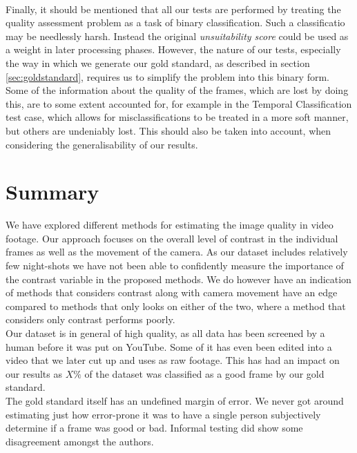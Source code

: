 \\
Finally, it should be mentioned that all our tests are performed by treating the quality assessment problem as a task of binary classification. Such a classificatio may be needlessly harsh. Instead the original \textit{unsuitability score} could be used as a weight in later processing phases. However, the nature of our tests, especially the way in which we generate our gold standard, as described in section \ref{sec:goldstandard}, requires us to simplify the problem into this binary form. Some of the information about the quality of the frames, which are lost by doing this, are to some extent accounted for, for example in the Temporal Classification test case, which allows for misclassifications to be treated in a more soft manner, but others are undeniably lost. This should also be taken into account, when considering the generalisability of our results.
%
\section{Summary}
%
We have explored different methods for estimating the image quality in video footage. Our approach focuses on the overall level of contrast in the individual frames as well as the movement of the camera. As our dataset includes relatively few night-shots we have not been able to confidently measure the importance of the contrast variable in the proposed methods. We do however have an indication of methods that considers contrast along with camera movement have an edge compared to methods that only looks on either of the two, where a method that considers only contrast performs poorly.\\
Our dataset is in general of high quality, as all data has been screened by a human before it was put on YouTube. Some of it has even been edited into a video that we later cut up and uses as raw footage. This has had an impact on our results as $X\%$ of the dataset was classified as a good frame by our gold standard.\\
The gold standard itself has an undefined margin of error. We never got around estimating just how error-prone it was to have a single person subjectively determine if a frame was good or bad. Informal testing did show some disagreement amongst the authors.
%